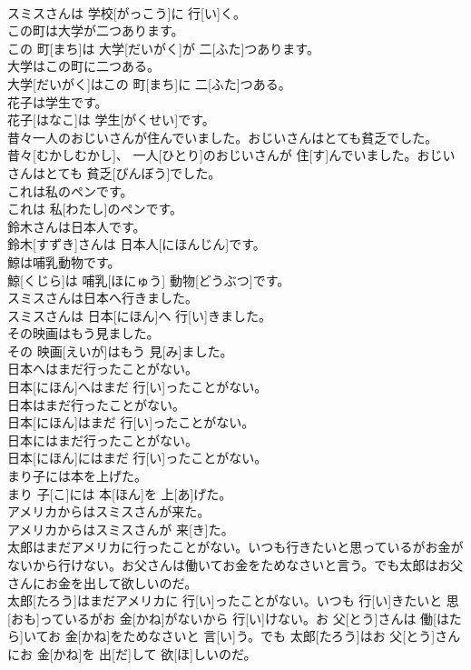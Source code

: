 \documentclass[8pt]{extreport}
\begin{document}
\begin{CJK}{UTF8}{min}
\\	スミスさんは 学校[がっこう]に 行[い]く。
\\	この町は大学が二つあります。	
\\	この 町[まち]は 大学[だいがく]が 二[ふた]つあります。
\\	大学はこの町に二つある。	
\\	大学[だいがく]はこの 町[まち]に 二[ふた]つある。
\\	花子は学生です。	
\\	花子[はなこ]は 学生[がくせい]です。
\\	昔々一人のおじいさんが住んでいました。おじいさんはとても貧乏でした。	
\\	昔々[むかしむかし]、 一人[ひとり]のおじいさんが 住[す]んでいました。おじいさんはとても 貧乏[びんぼう]でした。
\\	これは私のペンです。	
\\	これは 私[わたし]のペンです。
\\	鈴木さんは日本人です。	
\\	鈴木[すずき]さんは 日本人[にほんじん]です。
\\	鯨は哺乳動物です。	
\\	鯨[くじら]は 哺乳[ほにゅう] 動物[どうぶつ]です。
\\	スミスさんは日本へ行きました。	
\\	スミスさんは 日本[にほん]へ 行[い]きました。
\\	その映画はもう見ました。	
\\	その 映画[えいが]はもう 見[み]ました。
\\	日本へはまだ行ったことがない。	
\\	日本[にほん]へはまだ 行[い]ったことがない。
\\	日本はまだ行ったことがない。	
\\	日本[にほん]はまだ 行[い]ったことがない。
\\	日本にはまだ行ったことがない。	
\\	日本[にほん]にはまだ 行[い]ったことがない。
\\	まり子には本を上げた。	
\\	まり 子[こ]には 本[ほん]を 上[あ]げた。
\\	アメリカからはスミスさんが来た。	
\\	アメリカからはスミスさんが 来[き]た。
\\	太郎はまだアメリカに行ったことがない。いつも行きたいと思っているがお金がないから行けない。お父さんは働いてお金をためなさいと言う。でも太郎はお父さんにお金を出して欲しいのだ。	
\\	太郎[たろう]はまだアメリカに 行[い]ったことがない。いつも 行[い]きたいと 思[おも]っているがお 金[かね]がないから 行[い]けない。お 父[とう]さんは 働[はたら]いてお 金[かね]をためなさいと 言[い]う。でも 太郎[たろう]はお 父[とう]さんにお 金[かね]を 出[だ]して 欲[ほ]しいのだ。

\end{CJK}
\end{document}
